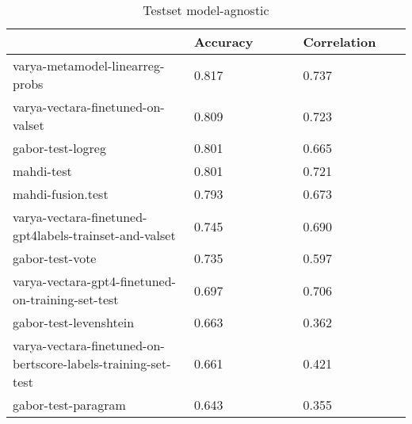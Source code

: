 \begin{table}
\centering
\caption{Testset model-agnostic}
\label{test-agnostic}
\begin{tabular}{|p{0.45\linewidth}|R{0.275\linewidth}|R{0.275\linewidth}|}
\hline
 & Accuracy & Correlation \\
\hline
varya-metamodel-linearreg-probs & 0.817 & 0.737 \\
varya-vectara-finetuned-on-valset & 0.809 & 0.723 \\
gabor-test-logreg & 0.801 & 0.665 \\
mahdi-test & 0.801 & 0.721 \\
mahdi-fusion.test & 0.793 & 0.673 \\
varya-vectara-finetuned-gpt4labels-trainset-and-valset & 0.745 & 0.690 \\
gabor-test-vote & 0.735 & 0.597 \\
varya-vectara-gpt4-finetuned-on-training-set-test & 0.697 & 0.706 \\
gabor-test-levenshtein & 0.663 & 0.362 \\
varya-vectara-finetuned-on-bertscore-labels-training-set-test & 0.661 & 0.421 \\
gabor-test-paragram & 0.643 & 0.355 \\
\hline
\end{tabular}
\end{table}
